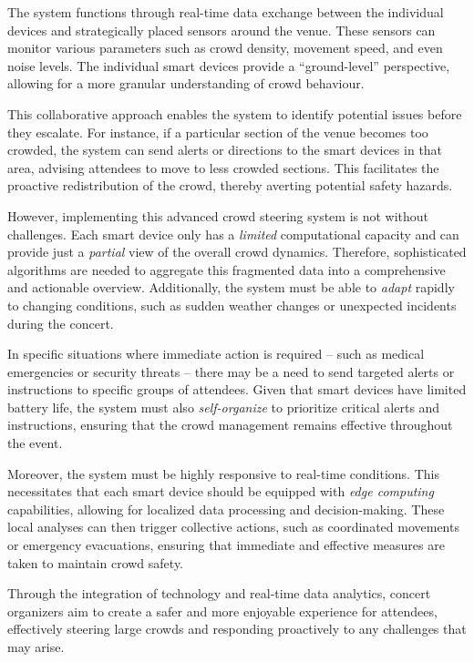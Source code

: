 The system functions through real-time data exchange between the individual devices and strategically placed sensors around the venue. 
 These sensors can monitor various parameters such as crowd density, 
 movement speed, and even noise levels. 
 The individual smart devices provide a ``ground-level'' perspective, 
 allowing for a more granular understanding of crowd behaviour.

This collaborative approach enables the system to identify potential issues before they escalate. 
 For instance, if a particular section of the venue becomes too crowded, 
 the system can send alerts or directions to the smart devices in that area, 
 advising attendees to move to less crowded sections. 
 This facilitates the proactive redistribution of the crowd, thereby averting potential safety hazards.

However, implementing this advanced crowd steering system is not without challenges. 
 Each smart device only has a \emph{limited} computational capacity and can provide just a \emph{partial} view of the overall crowd dynamics. 
 Therefore, sophisticated algorithms are needed to aggregate this fragmented data into a comprehensive and actionable overview. 
 Additionally, the system must be able to \emph{adapt} rapidly to changing conditions, such as sudden weather changes or unexpected incidents during the concert.

In specific situations where immediate action is required -- such as medical emergencies or security threats -- there may be a need to send targeted alerts or instructions to specific groups of attendees. Given that smart devices have limited battery life, 
 the system must also \emph{self-organize} to prioritize critical alerts and instructions, 
 ensuring that the crowd management remains effective throughout the event.

Moreover, the system must be highly responsive to real-time conditions. 
 This necessitates that each smart device should be equipped with \emph{edge computing} capabilities, allowing for localized data processing and decision-making. 
 These local analyses can then trigger collective actions, such as coordinated movements or emergency evacuations, ensuring that immediate and effective measures are taken to maintain crowd safety.

Through the integration of technology and real-time data analytics, 
 concert organizers aim to create a safer and more enjoyable experience for attendees, 
 effectively steering large crowds and responding proactively to any challenges that may arise.

